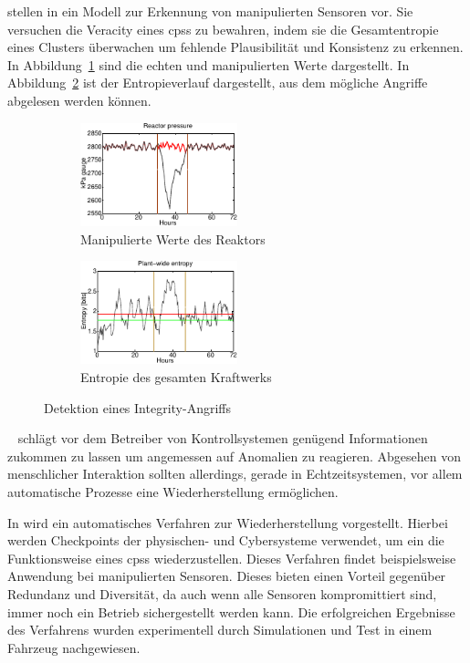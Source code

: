 \documentclass[final,bibliography=totocnumbered]{include/sikseminar}
\newcommand{\cps}{\glspl{cps}\xspace}
\begin{document}
\citeauthor{KLG15} stellen in \cite{KLG15} ein Modell zur Erkennung von manipulierten Sensoren vor.
Sie versuchen die Veracity eines \cps zu bewahren, indem sie die Gesamtentropie eines Clusters überwachen um fehlende Plausibilität und Konsistenz zu erkennen.
In Abbildung~\ref{fig:spoof} sind die echten und manipulierten Werte dargestellt.
In Abbildung~\ref{fig:entropy_success} ist der Entropieverlauf dargestellt, aus dem mögliche Angriffe abgelesen werden können.
\begin{figure}
    \centering
    \begin{subfigure}[t]{0.4\textwidth}
        \includegraphics[height=3cm]{entropy_a}
        \caption{Manipulierte Werte des Reaktors}
        \label{fig:spoof}
    \end{subfigure}
    \begin{subfigure}[t]{0.4\textwidth}
        \includegraphics[height=3cm]{entropy_b}
        \caption{Entropie des gesamten Kraftwerks}
        \label{fig:entropy_success}
    \end{subfigure}
    \caption{Detektion eines Integrity-Angriffs~\cite{KLG15}}
    \label{fig:entropie}
\end{figure}

\citeauthor{CAS+09}~\cite{CAS+09} schlägt vor dem Betreiber von Kontrollsystemen genügend Informationen zukommen zu lassen um angemessen auf Anomalien zu reagieren.
Abgesehen von menschlicher Interaktion sollten allerdings, gerade in Echtzeitsystemen, vor allem automatische Prozesse eine Wiederherstellung ermöglichen.

In \cite{KXW+18} wird ein automatisches Verfahren zur Wiederherstellung vorgestellt.
Hierbei werden Checkpoints der physischen- und Cybersysteme verwendet, um ein die Funktionsweise eines \cps wiederzustellen.
Dieses Verfahren findet beispielsweise Anwendung bei manipulierten Sensoren.
Dieses bieten einen Vorteil gegenüber Redundanz und Diversität, da auch wenn alle Sensoren kompromittiert sind, immer noch ein Betrieb sichergestellt werden kann.
Die erfolgreichen Ergebnisse des Verfahrens wurden experimentell durch Simulationen und Test in einem Fahrzeug nachgewiesen.
\end{document}

